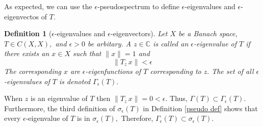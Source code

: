\documentclass[12pt,a4paper]{article}
\theoremstyle{boldthm}
\theoremstyle{bolddefn}
\newtheorem{definition}[theorem]{Definition}
\begin{document}
As expected, we can use the $\epsilon$-pseudospectrum to define $\epsilon$-eigenvalues and $\epsilon$-eigenvectos of $T.$ 

\begin{definition}[$\epsilon$-eigenvalues and $\epsilon$-eigenvectors]
    Let $X$ be a Banach space, $T \in C(X, X),$ and $\epsilon > 0$ be arbitary.  
    A $z \in \mathbb{C}$ is called an $\epsilon$-eigenvalue of $T$ if there exists an $x \in X$ such that $\|x\| = 1$ and 
    \begin{equation}
       \|T_z \, x \| < \epsilon
    \end{equation}
    The corresponding $x$ are $\epsilon$-eigenfunctions of $T$ corresponding to $z.$ 
    The set of all $\epsilon$-eigenvalues of $T$ is denoted $\Gamma_{\epsilon}(T).$
\end{definition}

When $z$ is an eigenvalue of $T$ then $\|T_z \, x \| = 0 < \epsilon.$ Thus, $\Gamma(T) \subset \Gamma_{\epsilon}(T).$ Furthermore, the third definition of $\sigma_{\epsilon}(T)$ in Definition \ref{pseudo def} shows that every $\epsilon$-eigenvalue of $T$ is in $\sigma_{\epsilon}(T),$ Therefore, $\Gamma_{\epsilon}(T) \subset \sigma_{\epsilon}(T).$






\newpage


\end{document}
